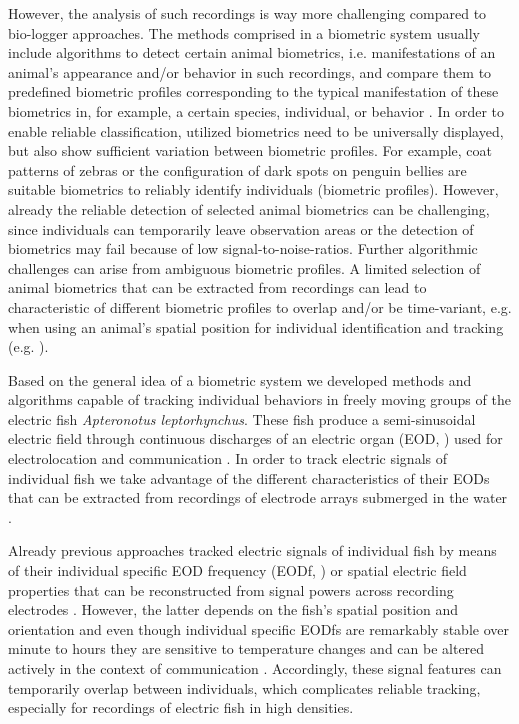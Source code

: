 \documentclass[11pt,pdftex]{article}
\newcommand{\Lepto}{\textit{Apteronotus leptorhynchus}}
\begin{document}
However, the analysis of such recordings is way more challenging compared to bio-logger approaches. The methods comprised in a biometric system usually include algorithms to detect certain animal biometrics, i.e. manifestations of an animal's appearance and/or behavior in such recordings, and compare them to predefined biometric profiles corresponding to the typical manifestation of these biometrics in, for example, a certain species, individual, or behavior \citep{Gaston2004, Sherley2010, Kuhl2013}. In order to enable reliable classification, utilized biometrics need to be universally displayed, but also show sufficient variation between biometric profiles. For example, coat patterns of zebras \citep{Lahiri2011} or the configuration of dark spots on penguin bellies \citep{Sherley2010} are suitable biometrics to reliably identify individuals (biometric profiles). However, already the reliable detection of selected animal biometrics can be challenging, since individuals can temporarily leave observation areas or the detection of biometrics may fail because of low signal-to-noise-ratios. Further algorithmic challenges can arise from ambiguous biometric profiles. A limited selection of animal biometrics that can be extracted from recordings can lead to characteristic of different biometric profiles to overlap and/or be time-variant, e.g. when using an animal's spatial position for individual identification and tracking (e.g. \citep{Madhav2018}).
  
Based on the general idea of a biometric system we developed methods and algorithms capable of tracking individual behaviors in freely moving groups of the electric fish \Lepto{}. These fish produce a semi-sinusoidal electric field through continuous discharges of an electric organ (EOD, \citealp{Turner2007}) used for electrolocation \citep{Fotowat2013} and communication \citep{Albert2005, Smith2013}. In order to track electric signals of individual fish we take advantage of the different characteristics of their EODs that can be extracted from recordings of electrode arrays submerged in the water \citep{Jun2013, Madhav2018, Henninger2018, Raab2019}. 

Already previous approaches tracked electric signals of individual fish by means of their individual specific EOD frequency (EODf, \citealp{Henninger2020}) or spatial electric field properties that can be reconstructed from signal powers across recording electrodes \citep{Madhav2018}. However, the latter depends on the fish's spatial position and orientation and even though individual specific EODfs are remarkably stable over minute to hours \citep{Moortgat1998} they are sensitive to temperature changes and can be altered actively in the context of communication \citep{Dunlap2000, Smith2013}. Accordingly, these signal features can temporarily overlap between individuals, which complicates reliable tracking, especially for recordings of electric fish in high densities.
\end{document}
